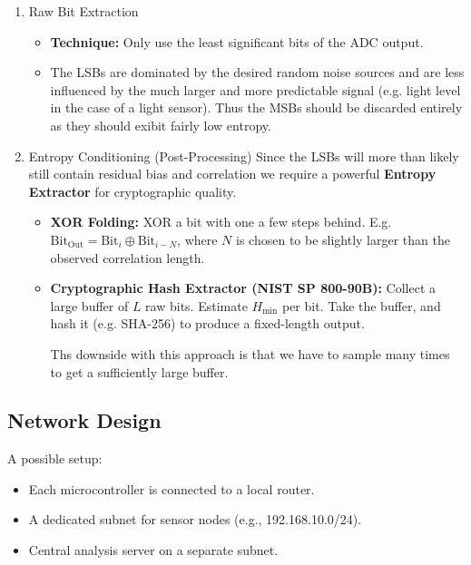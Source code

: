\begin{enumerate}
    \item Raw Bit Extraction 
        \begin{itemize}
            \item \textbf{Technique:} Only use the least significant
                bits of the ADC output. 
            \item The LSBs are dominated by the desired random noise 
                sources and are less influenced by the much larger 
                and more predictable signal 
                (e.g. light level in the case of a light sensor).
                Thus the MSBs should be discarded entirely as they 
                should exibit fairly low entropy.
        \end{itemize}

    \item Entropy Conditioning (Post-Processing) 
        Since the LSBs will more than likely still contain 
        residual bias and correlation we require a powerful 
        \textbf{Entropy Extractor} for cryptographic quality.
        \begin{itemize}
            \item \textbf{XOR Folding:}
                XOR a bit with one a few steps behind. 
                E.g. $\text{Bit}_{\text{Out}} = 
                \text{Bit}_i \oplus \text{Bit}_{i-N}$, 
                where $N$ is chosen to be slightly larger than 
                the observed correlation length.

            \item \textbf{Cryptographic Hash Extractor 
                (NIST SP 800-90B):}
                Collect a large buffer of $L$ raw bits. 
                Estimate $H_{\text{min}}$ per bit. Take the buffer, 
                and hash it (e.g. SHA-256) to produce a fixed-length 
                output.

                Ths downside with this approach is that we have to 
                sample many times to get a sufficiently large buffer.
        \end{itemize}
\end{enumerate}

\subsection{Network Design}
A possible setup:
\begin{itemize}
    \item Each microcontroller is connected to a local router.
    \item A dedicated subnet for sensor nodes (e.g., 192.168.10.0/24).
    \item Central analysis server on a separate subnet.
\end{itemize}

